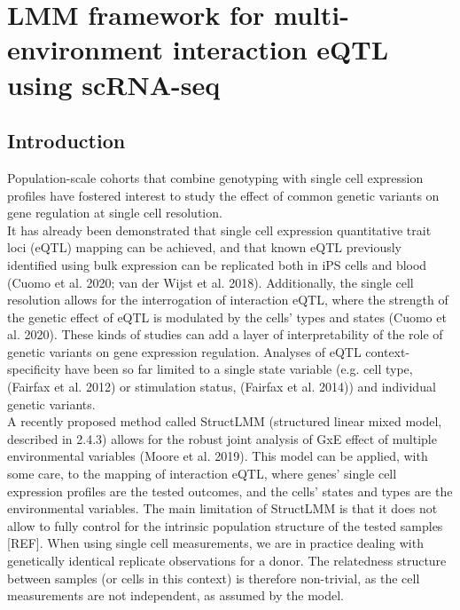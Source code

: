 
\chapter{LMM framework for multi-environment interaction eQTL using scRNA-seq}


\section{Introduction} 

Population-scale cohorts that combine genotyping with single cell expression profiles have fostered interest to study the effect of common genetic variants on gene regulation at single cell resolution.\\

It has already been demonstrated that single cell expression quantitative trait loci (eQTL) mapping can be achieved, and that known eQTL previously identified using bulk expression can be replicated both in iPS cells and blood (Cuomo et al. 2020; van der Wijst et al. 2018).
Additionally, the single cell resolution allows for the interrogation of interaction eQTL, where the strength of the genetic effect of eQTL is modulated by the cells’ types and states (Cuomo et al. 2020). 
These kinds of studies can add a layer of interpretability of the role of genetic variants on gene expression regulation. 
Analyses of eQTL context-specificity have been so far limited to a single state variable (e.g. cell type, (Fairfax et al. 2012) or stimulation status, (Fairfax et al. 2014)) and individual genetic variants.\\

A recently proposed method called StructLMM (structured linear mixed model, described in 2.4.3) allows for the robust joint analysis of GxE effect of multiple environmental variables (Moore et al. 2019).
This model can be applied, with some care, to the mapping of interaction eQTL, where genes’ single cell expression profiles are the tested outcomes, and the cells’ states and types are the environmental variables. 
The main limitation of StructLMM is that it does not allow to fully control for the intrinsic population structure of the tested samples [REF]. 
When using single cell measurements, we are in practice dealing with genetically identical replicate observations for a donor. 
The relatedness structure between samples (or cells in this context) is therefore non-trivial, as the cell measurements are not independent, as assumed by the model.\\

